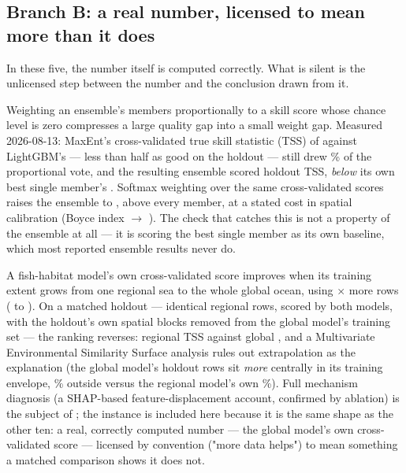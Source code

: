 \subsection{Branch B: a real number, licensed to mean more than it does}
\label{sec:branch-b}

In these five, the number itself is computed correctly. What is silent is
the unlicensed step between the number and the conclusion drawn from it.

 Weighting an ensemble's members proportionally to a skill
score whose chance level is zero compresses a large quality gap into a
small weight gap. Measured 2026-08-13: MaxEnt's cross-validated true skill
statistic (TSS) of \EnsMaxentCVOld{} against LightGBM's \EnsLGBMCVOld{} ---
less than half as good on the holdout --- still drew \EnsMaxentVoteOld{}\% of
the proportional vote, and the resulting ensemble scored \EnsPropScoreOld{}
holdout TSS, \emph{below} its own best single member's \EnsBestMemberOld{}.
Softmax weighting over the same cross-validated scores raises the ensemble
to \EnsSoftmaxScoreOld{}, above every member, at a stated cost in spatial
calibration (Boyce index \EnsBoyceOldBefore{} $\rightarrow$
\EnsBoyceOldAfter{}). The check that catches this is not a property of the
ensemble at all --- it is scoring the best single member as its own
baseline, which most reported ensemble results never do.

 A fish-habitat model's own cross-validated score
improves when its training extent grows from one regional sea to the whole
global ocean, using \GvrDataMultiple{}$\times$ more rows
(\GvrNRegionalTrain{} to \GvrNGlobalTrain{}). On a matched holdout ---
identical regional rows, scored by both models, with the holdout's own
spatial blocks removed from the global model's training set --- the ranking
reverses: regional TSS \GvrTSSRegion{} against global \GvrTSSGlobal{}, and a
Multivariate Environmental Similarity Surface analysis rules out
extrapolation as the explanation (the global model's holdout rows sit
\emph{more} centrally in its training envelope, \GvrMESSGlobal{}\% outside
versus the regional model's own \GvrMESSRegion{}\%). Full mechanism
diagnosis (a SHAP-based feature-displacement account, confirmed by ablation)
is the subject of \citep{moredata2026}; the instance is included here because
it is the same shape as the other ten: a real, correctly computed number ---
the global model's own cross-validated score --- licensed by convention
("more data helps") to mean something a matched comparison shows it does
not.

